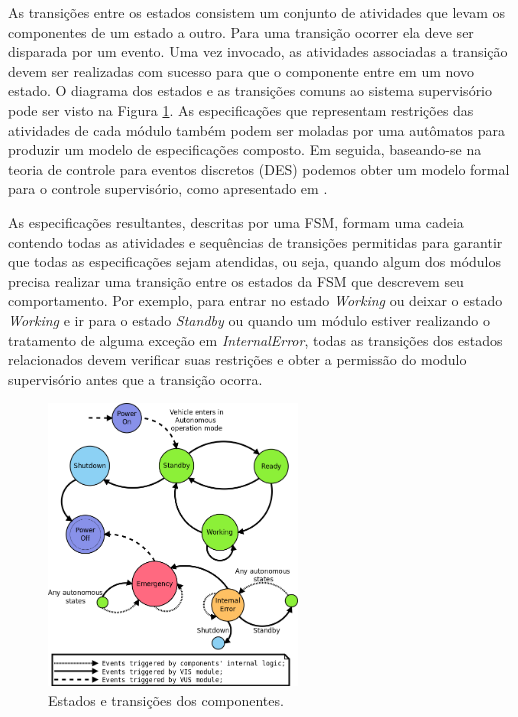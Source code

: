 \documentclass[conference]{IEEEtran}
\begin{document}
As transições entre os estados consistem um conjunto de atividades que levam os componentes de um estado a outro. Para uma transição ocorrer ela deve ser disparada por um evento. Uma vez invocado, as atividades associadas a transição devem ser realizadas com sucesso para que o componente entre em um novo estado. O diagrama dos estados e as transições comuns ao sistema supervisório pode ser visto na Figura \ref{fig:VILMA_STATE_MACHINE2}. As especificações que representam restrições das atividades de cada módulo também podem ser moladas por uma autômatos para produzir um modelo de especificações composto. Em seguida, baseando-se na teoria de controle para eventos discretos (DES) podemos obter um modelo formal para o controle supervisório, como apresentado em \cite{event_systems}.

As especificações resultantes, descritas por uma FSM, formam uma cadeia contendo todas as atividades e sequências de transições permitidas para garantir que todas as especificações sejam atendidas, ou seja, quando algum dos módulos precisa realizar uma transição entre os estados da FSM que descrevem seu comportamento. Por exemplo, para entrar no estado \textit{Working} ou deixar o estado \textit{Working} e ir para o estado \textit{Standby} ou quando um módulo estiver realizando o tratamento de alguma exceção em \textit{InternalError}, todas as transições dos estados relacionados devem verificar suas restrições e obter a permissão do modulo supervisório antes que a transição ocorra. 

\begin{figure}[h]
	\centering
	\includegraphics[width=250px,keepaspectratio]{imagens/VILMA_STATE_MACHINE2}
	\caption{Estados e transições dos componentes.}
	\label{fig:VILMA_STATE_MACHINE2}
\end{figure}
\end{document}
